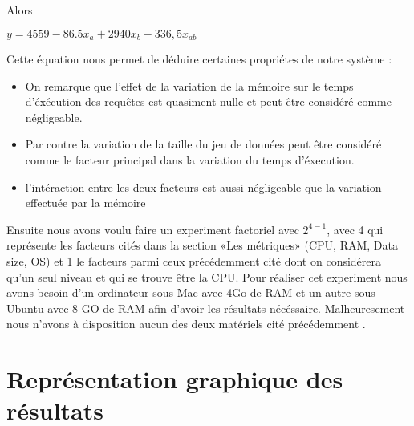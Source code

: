 \documentclass[12pt]{report}
\begin{document}
Alors
\begin{center}
  $y=4559-86.5x_a+2940x_b-336,5x_{ab}$
\end{center}
Cette équation nous permet de déduire certaines propriétes de notre système :
\begin{itemize}
\item On remarque que l'effet de la variation de la mémoire sur le temps d'éxécution des requêtes est quasiment nulle et peut être considéré comme négligeable.
\item Par contre la variation de la taille du jeu de données peut être considéré comme le facteur principal dans la variation du temps d'éxecution.
\item l'intéraction entre les deux facteurs est aussi négligeable que la variation effectuée par la mémoire
\end{itemize}

Ensuite nous avons voulu faire un experiment factoriel avec $2^{4-1}$, avec 4 qui représente les facteurs cités dans la section «Les métriques» (CPU, RAM, Data size, OS) et 1 le facteurs parmi ceux précédemment cité dont on considérera qu'un seul niveau et qui se trouve être la CPU.
Pour réaliser cet experiment nous avons besoin d'un ordinateur sous Mac avec 4Go de RAM et un autre sous Ubuntu avec 8 GO de RAM afin d'avoir les résultats nécéssaire. Malheuresement nous n'avons à disposition aucun des deux matériels cité précédemment .
\newpage
\section{Représentation graphique des résultats}
\end{document}
